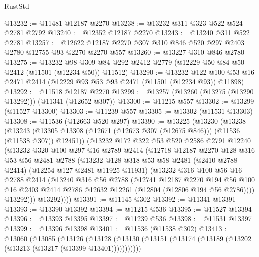\begin{lexlean}{RustStd}
\begin{coremodule}
@13232 := @11481 @12187 @2270
@13238 := @13232 @311 @323 @522 @524 @2781 @2792
@13240 := @12352 @12187 @2270
@13243 := @13240 @311 @522 @2781
@13257 := @12622 @12187 @2270 @307 @310 @846 @520 @297 @2403 @2780 @12755 @93 @2270 @2270 @557
@13260 := @13227 @310 @846 @2780
@13275 := @13232
    @98
    @309
    @84
    @292
    @2412
    @2779
    (@12229 @50 @84 @50 @2412 (@11501 (@12234 @50)) @11512)
@13290 := @13232
    @122
    @100
    @53
    @16
    @2471
    @2414
    (@12229 @93 @53 @93 @2471 (@11501 (@12234 @93)) @11898)
@13292 := @11518 @12187 @2270
@13299 := @13257 (@13260 (@13275 (@13290 @13292))) (@11341 (@12652 @307))
@13300 := @11215 @557
@13302 := @13299 (@11527 @13300)
@13303 := @11239 @557
@13305 := @13302 (@11531 @13303)
@13308 := @11536 (@12663 @520 @297)
@13390 := @13225
    (@13230
      (@13238
        (@13243 (@13305 @13308 (@12671 (@12673 @307 (@12675 @846))) (@11536 (@11538 @307)) @12451))
        (@13232
          @172
          @322
          @53
          @520
          @2586
          @2791
          @12240
          (@13232
            @320
            @100
            @297
            @16
            @2789
            @2414
            (@12718
              @12187
              @2270
              @128
              @316
              @53
              @56
              @2481
              @2788
              (@13232
                @128
                @318
                @53
                @58
                @2481
                (@2410 @2788 @2414)
                (@12254 @127 @2481 @11925 @11931)
                (@13232
                  @316
                  @100
                  @56
                  @16
                  @2788
                  @2414
                  (@13240
                    @316
                    @56
                    @2788
                    (@12741
                      @12187
                      @2270
                      @194
                      @56
                      @100
                      @16
                      @2403
                      @2414
                      @2786
                      @12632
                      @12261
                      (@12804 (@12806 @194 @56 @2786))))
                  @13292)))
            @13292))))
@13391 := @11145 @302
@13392 := @11341 @13391
@13393 := @13390 @13392
@13394 := @11215 @536
@13395 := @11527 @13394
@13396 := @13393 @13395
@13397 := @11239 @536
@13398 := @11531 @13397
@13399 := @13396 @13398
@13401 := @11536 (@11538 @302)
@13413 := @13060
    (@13085
      (@13126
        (@13128 (@13130 (@13151 (@13174 (@13189 (@13202 (@13213 (@13217 (@13399 @13401)))))))))))

\end{coremodule}
\end{lexlean}
